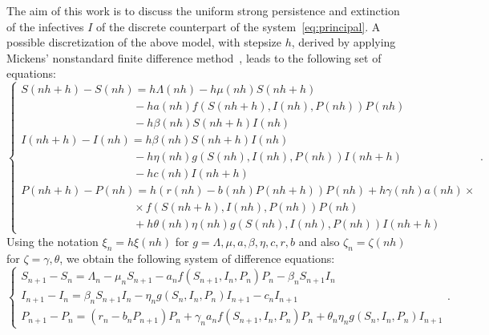 \documentclass[reqno]{amsart}
\begin{document}
The aim of this work is to discuss the uniform strong persistence and extinction of the infectives $I$ of the discrete counterpart of the system~\eqref{eq:principal}. A possible discretization of the above model, with stepsize $h$, derived by applying Mickens' nonstandard finite difference method~\cite{Mickens-JCAM-1999}, leads to the following set of equations:
\[
\begin{cases}
S(nh+h)-S(nh)
= h\Lambda(nh)-h\mu(nh)S(nh+h)\\
\quad\quad \quad \quad\quad \quad \quad\quad \quad \quad -ha(nh){f(S(nh+h),I(nh),P(nh))P(nh)}\\
\quad\quad \quad \quad\quad \quad \quad\quad \quad \quad -h\beta(nh)S(nh+h)I(nh)\\
I(nh+h)-I(nh)
= h\beta(nh)S(nh+h)I(nh)\\
\quad\quad \quad \quad\quad \quad \quad\quad \quad \quad -h\eta(nh)g(S(nh),I(nh),P(nh))I(nh+h)\\
\quad\quad \quad \quad\quad \quad \quad\quad \quad \quad  -hc(nh)I(nh+h)\\
P(nh+h)-P(nh)=h(r(nh)-b(nh)P(nh+h))P(nh)+h\gamma(nh)a(nh)\times\\
\quad\quad \quad \quad\quad \quad \quad\quad \quad \quad
\times {f(S(nh+h),I(nh),P(nh))P(nh)}\\
\quad\quad \quad \quad\quad \quad \quad\quad \quad \quad +h\theta(nh)\eta(nh)g(S(nh),I(nh),P(nh))I(nh+h)
\end{cases}.
\]
Using the notation $\xi_n=h\xi(nh)$ for $g=\Lambda, \mu, a, \beta, \eta, c, r, b$ and also $\zeta_n=\zeta(nh)$ for $\zeta=\gamma, \theta$, we obtain the following system of difference equations:
\begin{equation}\label{eq:principal-disc}
\begin{cases}
S_{n+1}-S_n=\Lambda_n-\mu_nS_{n+1}-a_n{f(S_{n+1},I_n,P_n)P_n}-\beta_nS_{n+1}I_n\\
I_{n+1}-I_n=\beta_nS_{n+1}I_n-\eta_ng(S_n,I_n,P_n)I_{n+1}-c_nI_{n+1}\\
P_{n+1}-P_n=(r_n-b_nP_{n+1})P_n+\gamma_na_n{f(S_{n+1},I_n,P_n)P_n}+\theta_n\eta_ng(S_n,I_n,P_n)I_{n+1}
\end{cases}.
\end{equation}
\end{document}
